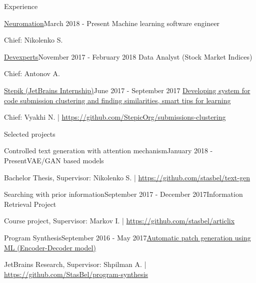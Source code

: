 \documentclass{resume} %
\begin{document}
\begin{rSection}{Experience}

\begin{rSubsection}{\href{http://stepik.org/}{Neuromation}}{March 2018 - Present}
{Machine learning software engineer}{} 
\item[] Chief: Nikolenko S.
\end{rSubsection}

\begin{rSubsection}{\href{http://stepik.org/}{Devexperts}}{November 2017 - February 2018}
{Data Analyst (Stock Market Indices)}{} 
\item[] Chief: Antonov A.
\end{rSubsection}

\begin{rSubsection}{\href{http://stepik.org/}{Stepik (JetBrains Internship)}}{June 2017 - September 2017}
{\href{https://jetbrains.ru/students/internship/themes/again/}{Developing system for code submission clustering and finding similarities, smart tips for learning}}{} 
\item[] Chief: Vyakhi N. | \url{https://github.com/StepicOrg/submissions-clustering}
\end{rSubsection}

\end{rSection} 
\vspace{-1.2\baselineskip}
\begin{rSection}{Selected projects}

\begin{rSubsection}{Controlled text generation with attention mechanism}{January 2018 - Present}{VAE/GAN based models}{}
\item[] Bachelor Thesis, Supervisor: Nikolenko S. | \url{https://github.com/stasbel/text-gen}
\end{rSubsection}

\begin{rSubsection}{Searching with prior information}{September 2017 - December 2017}{Information Retrieval Project}{}
\item[] Course project, Supervisor: Markov I. | \url{https://github.com/stasbel/articlix}
\end{rSubsection}

\begin{rSubsection}{Program Synthesis}{September 2016 - May 2017}{\href{https://docs.google.com/presentation/d/113EFcW8L7p8ickhfMoht8ivOomq2fRPizLtWSH9cSX4/pub?start=false&loop=false&delayms=3000}{Automatic patch generation using ML (Encoder-Decoder model)}}{}
\item[] JetBrains Research, Supervisor: Shpilman A. | \url{https://github.com/StasBel/program-synthesis}
\end{rSubsection}

\end{rSection}
\end{document}
